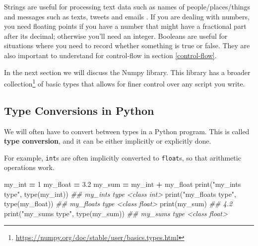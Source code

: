 \documentclass[
  12pt,
  krantz2]{krantz}
\makeatletter
\newenvironment{Shaded}{\begin{snugshade}}{\end{snugshade}}
\newcommand{\BuiltInTok}[1]{#1}
\newcommand{\CommentTok}[1]{\textcolor[rgb]{0.37,0.37,0.37}{\textit{#1}}}
\newcommand{\DecValTok}[1]{\textcolor[rgb]{0.06,0.06,0.06}{#1}}
\newcommand{\FloatTok}[1]{\textcolor[rgb]{0.06,0.06,0.06}{#1}}
\newcommand{\NormalTok}[1]{#1}
\newcommand{\OperatorTok}[1]{\textcolor[rgb]{0.43,0.43,0.43}{\textbf{#1}}}
\newcommand{\StringTok}[1]{\textcolor[rgb]{0.5,0.5,0.5}{#1}}
\renewcommand{\href}[2]{#2\footnote{\url{#1}}}
\newenvironment{kframe}{%
\medskip{}
\setlength{\fboxsep}{.8em}
 \def\at@end@of@kframe{}%
 \ifinner\ifhmode%
  \def\at@end@of@kframe{\end{minipage}}%
  \begin{minipage}{\columnwidth}%
 \fi\fi%
 \def\FrameCommand##1{\hskip\@totalleftmargin \hskip-\fboxsep
 \colorbox{shadecolor}{##1}\hskip-\fboxsep
     \hskip-\linewidth \hskip-\@totalleftmargin \hskip\columnwidth}%
 \MakeFramed {\advance\hsize-\width
   \@totalleftmargin\z@ \linewidth\hsize
   \@setminipage}}%
 {\par\unskip\endMakeFramed%
 \at@end@of@kframe}
\renewenvironment{Shaded}{\begin{kframe}}{\end{kframe}}
\makeatother
\begin{document}
Strings are useful for processing text data such as names of people/places/things and messages such as texts, tweets and emails \citep{python_cookbook}. If you are dealing with numbers, you need floating points if you have a number that might have a fractional part after its decimal; otherwise you'll need an integer. Booleans are useful for situations where you need to record whether something is true or false. They are also important to understand for control-flow in section \ref{control-flow}.

In the next section we will discuss the Numpy library. This library has a \href{https://numpy.org/doc/stable/user/basics.types.html}{broader collection} of basic types that allows for finer control over any script you write.

\hypertarget{type-conversions-in-python}{%
\subsection{Type Conversions in Python}\label{type-conversions-in-python}}

We will often have to convert between types in a Python program. This is called \textbf{type conversion}, and it can be either implicitly or explicitly done.

For example, \texttt{int}s are often implicitly converted to \texttt{float}s, so that arithmetic operations work.

\begin{Shaded}
\begin{Highlighting}[]
\NormalTok{my\_int }\OperatorTok{=} \DecValTok{1}
\NormalTok{my\_float }\OperatorTok{=} \FloatTok{3.2}
\NormalTok{my\_sum }\OperatorTok{=}\NormalTok{ my\_int }\OperatorTok{+}\NormalTok{ my\_float}
\BuiltInTok{print}\NormalTok{(}\StringTok{"my\_int\textquotesingle{}s type"}\NormalTok{, }\BuiltInTok{type}\NormalTok{(my\_int))}
\CommentTok{\#\# my\_int\textquotesingle{}s type \textless{}class \textquotesingle{}int\textquotesingle{}\textgreater{}}
\BuiltInTok{print}\NormalTok{(}\StringTok{"my\_float\textquotesingle{}s type"}\NormalTok{, }\BuiltInTok{type}\NormalTok{(my\_float))}
\CommentTok{\#\# my\_float\textquotesingle{}s type \textless{}class \textquotesingle{}float\textquotesingle{}\textgreater{}}
\BuiltInTok{print}\NormalTok{(my\_sum)}
\CommentTok{\#\# 4.2}
\BuiltInTok{print}\NormalTok{(}\StringTok{"my\_sum\textquotesingle{}s type"}\NormalTok{, }\BuiltInTok{type}\NormalTok{(my\_sum))}
\CommentTok{\#\# my\_sum\textquotesingle{}s type \textless{}class \textquotesingle{}float\textquotesingle{}\textgreater{}}
\end{Highlighting}
\end{Shaded}
\end{document}
